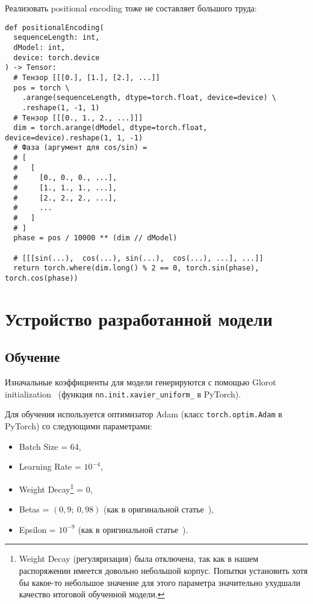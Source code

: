 Реализовать positional encoding тоже не составляет большого труда:

\begin{verbatim}
def positionalEncoding(
  sequenceLength: int,
  dModel: int,
  device: torch.device
) -> Tensor:
  # Тензор [[[0.], [1.], [2.], ...]]
  pos = torch \
    .arange(sequenceLength, dtype=torch.float, device=device) \
    .reshape(1, -1, 1)
  # Тензор [[[0., 1., 2., ...]]]
  dim = torch.arange(dModel, dtype=torch.float, device=device).reshape(1, 1, -1)
  # Фаза (аргумент для cos/sin) =
  # [
  #   [
  #     [0., 0., 0., ...],
  #     [1., 1., 1., ...],
  #     [2., 2., 2., ...],
  #     ...
  #   ]
  # ]
  phase = pos / 10000 ** (dim // dModel)

  # [[[sin(...),  cos(...), sin(...),  cos(...), ...], ...]]
  return torch.where(dim.long() % 2 == 0, torch.sin(phase), torch.cos(phase))
\end{verbatim}


\section{Устройство разработанной модели}


\subsection{Обучение}


Изначальные коэффициенты для модели генерируются с помощью Glorot initialization~\cite{Glorot} (функция \texttt{nn.init.xavier\_uniform\_} в PyTorch).

Для обучения используется оптимизатор Adam (класс \texttt{torch.optim.Adam} в PyTorch) со следующими параметрами:
\begin{itemize}%
  \item Batch Size = 64,
  \item Learning Rate = $10^{-4}$,
  \item Weight Decay\footnote{Weight Decay (регуляризация) была отключена, так как в нашем распоряжении имеется довольно небольшой корпус. Попытки установить хотя бы какое-то небольшое значение для этого параметра значительно ухудшали качество итоговой обученной модели.} = 0,
  \item Betas = $(0{,}9;\ 0{,}98)$ (как в оригинальной статье~\cite{vaswani2017attention}),
  \item Epsilon = $10^{-9}$ (как в оригинальной статье~\cite{vaswani2017attention}).
\end{itemize}

